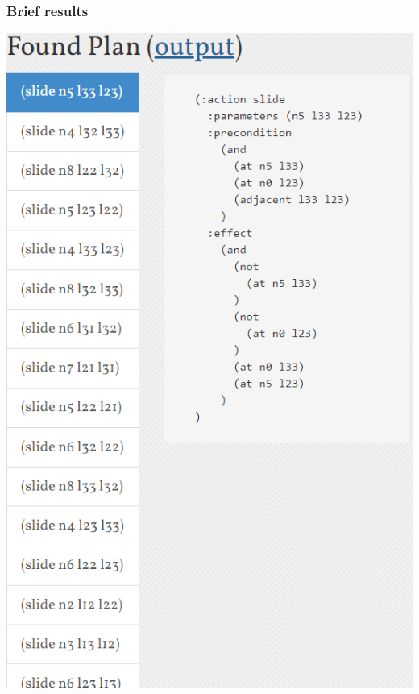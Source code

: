 ﻿\documentclass[a4paper, 11pt]{article}
\begin{document}
\subsubsection{Brief results}
\includegraphics[width=14cm]{result1.png}
\end{document}
